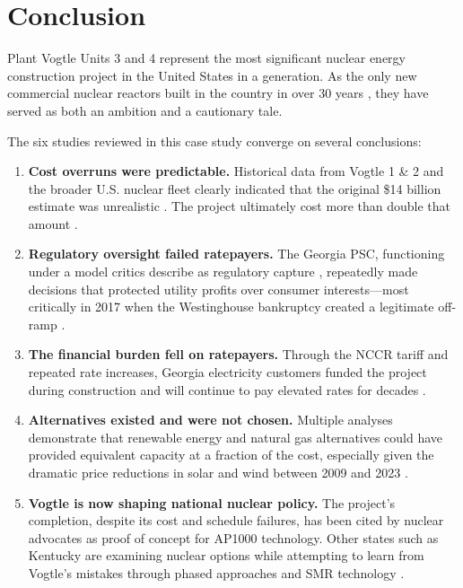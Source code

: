 \documentclass[12pt,a4paper]{article}
\begin{document}
\section{Conclusion}

Plant Vogtle Units 3 and 4 represent the most significant nuclear energy construction
project in the United States in a generation. As the only new commercial nuclear
reactors built in the country in over 30 years \cite{durand_truth}, they have served as both an ambition
and a cautionary tale.

The six studies reviewed in this case study converge on several conclusions:

\begin{enumerate}
    \item \textbf{Cost overruns were predictable.} Historical data from Vogtle 1 \& 2
          and the broader U.S. nuclear fleet clearly indicated that the original \$14 billion
          estimate was unrealistic \cite{schlissel_ieefa,doe_eia0485}. The project ultimately cost more than double that amount \cite{gcv_ratepayer,schlissel_ieefa}.

    \item \textbf{Regulatory oversight failed ratepayers.} The Georgia PSC, functioning
          under a model critics describe as regulatory capture \cite{gcv_ratepayer,durand_truth}, repeatedly made decisions
          that protected utility profits over consumer interests---most critically in 2017
          when the Westinghouse bankruptcy created a legitimate off-ramp \cite{gcv_ratepayer,durand_truth,schlissel_ieefa}.

    \item \textbf{The financial burden fell on ratepayers.} Through the NCCR tariff and
          repeated rate increases, Georgia electricity customers funded the project during
          construction and will continue to pay elevated rates for decades \cite{gcv_ratepayer}.

    \item \textbf{Alternatives existed and were not chosen.} Multiple analyses demonstrate
          that renewable energy and natural gas alternatives could have provided equivalent
          capacity at a fraction of the cost, especially given the dramatic price reductions
          in solar and wind between 2009 and 2023 \cite{gcv_ratepayer,durand_truth}.

    \item \textbf{Vogtle is now shaping national nuclear policy.} The project's completion,
          despite its cost and schedule failures, has been cited by nuclear advocates as
          proof of concept for AP1000 technology. Other states such as Kentucky are
          examining nuclear options while attempting to learn from Vogtle's mistakes
          through phased approaches and SMR technology \cite{kentucky_sjr79}.
\end{enumerate}
\end{document}
